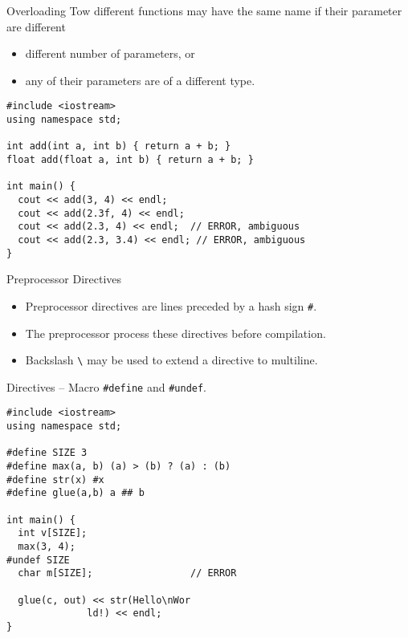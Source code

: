 \documentclass[presentation]{beamer}
\begin{document}
\begin{frame}[fragile,label={sec:orgheadline43}]{Overloading}
 Tow different functions may have the same name if their parameter
are different
\begin{itemize}
\item different number of parameters, or
\item any of their parameters are of a different type.
\end{itemize}

\begin{verbatim}
#include <iostream>
using namespace std;

int add(int a, int b) { return a + b; }
float add(float a, int b) { return a + b; }

int main() {
  cout << add(3, 4) << endl;
  cout << add(2.3f, 4) << endl;
  cout << add(2.3, 4) << endl;  // ERROR, ambiguous
  cout << add(2.3, 3.4) << endl; // ERROR, ambiguous
}
\end{verbatim}
\end{frame}

\begin{frame}[fragile,label={sec:orgheadline44}]{Preprocessor Directives}
 \begin{itemize}
\item Preprocessor directives are lines preceded by a hash sign \texttt{\#}.
\item The preprocessor process these directives \alert{before} compilation.
\item Backslash \texttt{\textbackslash{}} may be used to extend a directive to multiline.
\end{itemize}
\end{frame}

\begin{frame}[fragile,label={sec:orgheadline45}]{Directives -- Macro}
 \texttt{\#define} and \texttt{\#undef}.

\begin{verbatim}
#include <iostream>
using namespace std;

#define SIZE 3
#define max(a, b) (a) > (b) ? (a) : (b)
#define str(x) #x
#define glue(a,b) a ## b

int main() {
  int v[SIZE];
  max(3, 4);
#undef SIZE
  char m[SIZE];                 // ERROR

  glue(c, out) << str(Hello\nWor
              ld!) << endl;
}
\end{verbatim}
\end{frame}
\end{document}
